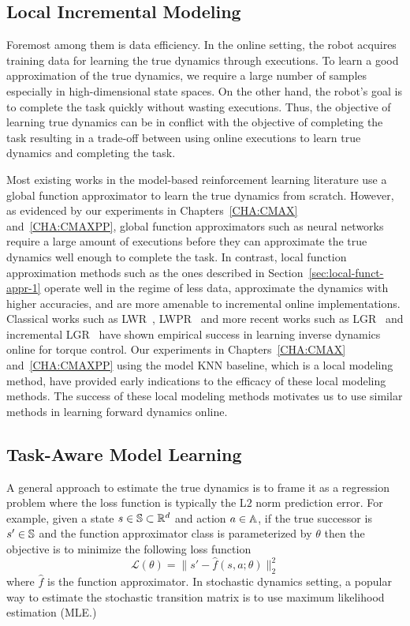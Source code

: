 \subsection{Local Incremental Modeling}
\label{sec:local-modeling}

Foremost among them is data efficiency. In the online setting, the
robot acquires training data for learning the true dynamics through
executions. To learn a good approximation of the true dynamics, we
require a large number of samples especially in high-dimensional state
spaces. On the other hand, the robot's goal is to complete the task
quickly without wasting executions. Thus, the objective of learning
true dynamics can be in conflict with the objective of completing the
task resulting in a trade-off between using online executions to learn
true dynamics and completing the task.

Most existing works in the model-based
reinforcement learning literature use a global function
approximator to learn the true dynamics from scratch. However, as
evidenced by our experiments in Chapters~\ref{CHA:CMAX}
and~\ref{CHA:CMAXPP}, global function approximators such as
neural networks require a large amount of executions before they can
approximate the true dynamics well enough to complete the task. In
contrast, local function approximation methods such as the ones
described in Section~\ref{sec:local-funct-appr-1} operate well in the
regime of less data, approximate the dynamics with higher accuracies, and are more
amenable to incremental online implementations. Classical works such as
LWR~\cite{DBLP:journals/air/AtkesonMS97},
LWPR~\cite{DBLP:conf/icml/VijayakumarS00} and more recent works such
as LGR~\cite{DBLP:journals/corr/MeierHS14} and incremental
LGR~\cite{DBLP:conf/nips/MeierHS14} have shown empirical success in
learning inverse dynamics online for torque
control. Our experiments in Chapters~\ref{CHA:CMAX} and~\ref{CHA:CMAXPP}
using the model KNN baseline, which is a local modeling method, have
provided early indications to the efficacy of these local modeling
methods. The success of these local modeling methods motivates us to
use similar methods in learning forward dynamics online. 

\subsection{Task-Aware Model Learning}
\label{sec:task-driven-learning}

A general approach to estimate the true dynamics is to frame it as a
regression problem where the loss function is typically the L$2$ norm
prediction error. For example, given a state $s \in \mathbb{S}
\subset \mathbb{R}^d$
and action $a \in \mathbb{A}$,
if the true successor is $s' \in \mathbb{S}$ and the function
approximator class is parameterized by $\theta$ then the objective is
to minimize the following loss function
\begin{equation}
  \label{eq:16}
  \mathcal{L}(\theta) = \|s' - \hat{f}(s, a; \theta)\|_2^2
\end{equation}
where $\hat{f}$ is the function approximator. In stochastic dynamics
setting, a popular way to estimate the stochastic transition matrix is
to use maximum likelihood estimation (MLE.)

